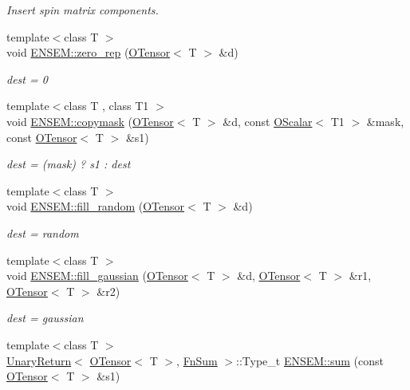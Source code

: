 \begin{DoxyCompactItemize}
\begin{DoxyCompactList}\small\item\em Insert spin matrix components. \end{DoxyCompactList}\item 
{\footnotesize template$<$class T $>$ }\\void \mbox{\hyperlink{group__obstensor_gaf56968b79ae090632d1e778d827ac0dd}{E\+N\+S\+E\+M\+::zero\+\_\+rep}} (\mbox{\hyperlink{classENSEM_1_1OTensor}{O\+Tensor}}$<$ T $>$ \&d)
\begin{DoxyCompactList}\small\item\em dest = 0 \end{DoxyCompactList}\item 
{\footnotesize template$<$class T , class T1 $>$ }\\void \mbox{\hyperlink{group__obstensor_gaec447bbfae019c25fe1906a76108bff8}{E\+N\+S\+E\+M\+::copymask}} (\mbox{\hyperlink{classENSEM_1_1OTensor}{O\+Tensor}}$<$ T $>$ \&d, const \mbox{\hyperlink{classENSEM_1_1OScalar}{O\+Scalar}}$<$ T1 $>$ \&mask, const \mbox{\hyperlink{classENSEM_1_1OTensor}{O\+Tensor}}$<$ T $>$ \&s1)
\begin{DoxyCompactList}\small\item\em dest = (mask) ? s1 \+: dest \end{DoxyCompactList}\item 
{\footnotesize template$<$class T $>$ }\\void \mbox{\hyperlink{group__obstensor_ga7d63bb40d886b853e075aec1dea0a717}{E\+N\+S\+E\+M\+::fill\+\_\+random}} (\mbox{\hyperlink{classENSEM_1_1OTensor}{O\+Tensor}}$<$ T $>$ \&d)
\begin{DoxyCompactList}\small\item\em dest = random \end{DoxyCompactList}\item 
{\footnotesize template$<$class T $>$ }\\void \mbox{\hyperlink{group__obstensor_ga5461ae19cc6cfc4271fe13264bbda77d}{E\+N\+S\+E\+M\+::fill\+\_\+gaussian}} (\mbox{\hyperlink{classENSEM_1_1OTensor}{O\+Tensor}}$<$ T $>$ \&d, \mbox{\hyperlink{classENSEM_1_1OTensor}{O\+Tensor}}$<$ T $>$ \&r1, \mbox{\hyperlink{classENSEM_1_1OTensor}{O\+Tensor}}$<$ T $>$ \&r2)
\begin{DoxyCompactList}\small\item\em dest = gaussian \end{DoxyCompactList}\item 
{\footnotesize template$<$class T $>$ }\\\mbox{\hyperlink{structENSEM_1_1UnaryReturn}{Unary\+Return}}$<$ \mbox{\hyperlink{classENSEM_1_1OTensor}{O\+Tensor}}$<$ T $>$, \mbox{\hyperlink{structENSEM_1_1FnSum}{Fn\+Sum}} $>$\+::Type\+\_\+t \mbox{\hyperlink{group__obstensor_ga83a9795df4ff312d25e7971ff02b5e8b}{E\+N\+S\+E\+M\+::sum}} (const \mbox{\hyperlink{classENSEM_1_1OTensor}{O\+Tensor}}$<$ T $>$ \&s1)

\end{DoxyCompactItemize}
